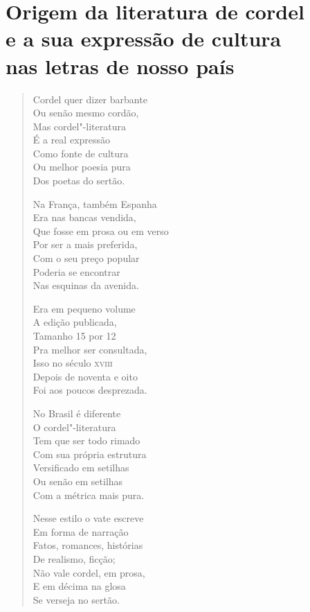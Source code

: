 \chapter[Origem da literatura de cordel e a sua expressão de cultura nas letras de nosso país]{Origem da literatura de cordel\\ e a sua expressão de cultura\\ nas letras de nosso país}

\begin{verse}
Cordel quer dizer barbante \\
Ou senão mesmo cordão, \\
Mas cordel"-literatura \\
É a real expressão \\
Como fonte de cultura \\
Ou melhor poesia pura \\
Dos poetas do sertão. 

Na França, também Espanha \\
Era nas bancas vendida, \\
Que fosse em prosa ou em verso \\
Por ser a mais preferida, \\
Com o seu preço popular \\
Poderia se encontrar \\
Nas esquinas da avenida. 


Era em pequeno volume \\
A edição publicada, \\
Tamanho 15 por 12 \\
Pra melhor ser consultada, \\
Isso no século \textsc{xviii} \\
Depois de noventa e oito \\
Foi aos poucos desprezada. 

No Brasil é diferente \\
O cordel"-literatura \\
Tem que ser todo rimado \\
Com sua própria estrutura \\
Versificado em setilhas \\
Ou senão em setilhas \\
Com a métrica mais pura. 

Nesse estilo o vate escreve \\
Em forma de narração \\
Fatos, romances, histórias \\
De realismo, ficção; \\
Não vale cordel, em prosa, \\
E em décima na glosa \\
Se verseja no sertão. 


\end{verse}
